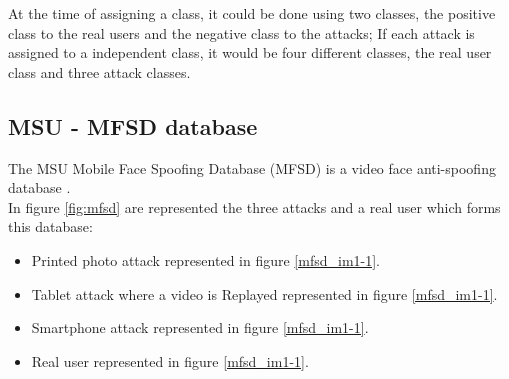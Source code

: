 At the time of assigning a class, it could be done using two classes, the positive class to the real users and the negative class to the attacks; If each attack is assigned to a independent class, it would be four different classes, the real user class and three attack classes.\\



\subsection{MSU - MFSD database}
The MSU Mobile Face Spoofing Database (MFSD) is a video face anti-spoofing database \cite{MSUdatabse}.\\

In figure \ref{fig:mfsd} are represented the three attacks and a real user which forms this database:\\
\begin{itemize}
\item Printed photo attack represented in figure \ref{mfsd_im1-1}.
\item Tablet attack where a video is Replayed represented in figure \ref{mfsd_im1-1}.
\item Smartphone attack represented in figure \ref{mfsd_im1-1}.
\item Real user represented in figure \ref{mfsd_im1-1}.
\end{itemize}

